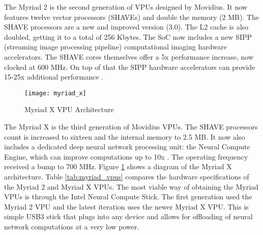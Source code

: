 The Myriad 2 is the second generation of VPUs designed by Movidius. It now features twelve vector processors (SHAVEs) and double the memory (2 MB). The SHAVE processors are a new and improved version (3.0). The L2 cache is also doubled, getting it to a total of 256 Kbytes. The SoC now includes a new SIPP (streaming image processing pipeline) computational imaging hardware accelerators. The SHAVE cores themselves offer a 5x performance increase, now clocked at 600 MHz. On top of that the SIPP hardware accelerators can provide 15-25x additional performance \cite{Moloney2014}.

\begin{figure}[thbp]
	\centering
	\texttt{[image: myriad\_x]}
	\caption{Myriad X VPU Architecture \cite{myriad_vpus}}
	\label{fig:myriad_x}
\end{figure}

The Myriad X is the third generation of Movidius VPUs. The SHAVE processors count is increased to sixteen and the internal memory to 2.5 MB. It now also includes a dedicated deep neural network processing unit: the Neural Compute Engine, which can improve computations up to 10x \cite{myriadx}. The operating frequency received a bump to 700 MHz. Figure \ref{fig:myriad_x} shows a diagram of the Myriad X architecture. Table \ref{tab:myriad_vpus} compares the hardware specifications of the Myriad 2 and Myriad X VPUs. The most viable way of obtaining the Myriad VPUs is through the Intel Neural Compute Stick. The first generation used the Myriad 2 VPU and the latest iteration uses the newer Myriad X VPU. This is simple USB3 stick that plugs into any device and allows for offloading of neural network computations at a very low power. \cite{ncs2}

